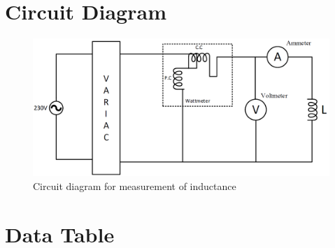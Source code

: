 \documentclass[a4paper,12pt]{article}
\begin{document}
	\section{Circuit Diagram}
	\begin{figure}[H]
		\centering
		\includegraphics[width=1\linewidth]{Images/1.4}
		\caption{Circuit diagram for measurement of inductance}
		\label{fig:1}
	\end{figure}
	\newpage
	\section{Data Table}
	
\end{document}
